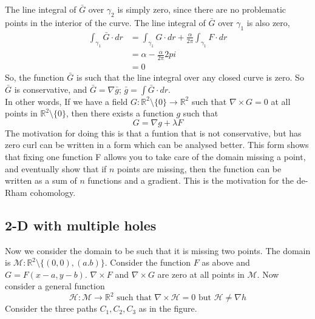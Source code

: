 \documentclass[a4paper]{article}
\begin{document}
The line integral of $\bar{G}$ over $\gamma_2$ is simply zero, since there are no problematic points in the interior of the curve. The line integral of $\bar{G}$ over $\gamma_1$ is also zero, 
\begin{align*}
    \int_{\gamma_1} \bar{G} \cdot dr &= \int_{\gamma_1} G \cdot dr + \frac{\alpha}{2\pi} \int_{\gamma_1} F \cdot dr \\
    &= \alpha - \frac{\alpha}{2\pi} 2pi\\
    &= 0
\end{align*}
So, the function $\bar{G}$ is such that the line integral over any closed curve is zero. So $\bar{G}$ is conservative, and $\bar{G} = \nabla \bar{g}$; $\bar{g} = \int \bar{G} \cdot dr$.  \\
In other words, If we have a field \(G: \mathbb{R}^2 \setminus \{0\} \rightarrow \mathbb{R}^2\) such that \(\nabla \times G = 0\) at all points in $\mathbb{R}^2 \setminus \{0\}$, then there exists a function $g$ such that
\[
    G = \nabla g + \lambda F\]
The motivation for doing this is that a funtion that is not conservative, but has zero curl can be written in a form which can be analysed better. This form shows that fixing one function F allows you to take care of the domain missing a point, and eventually show that if $n$ points are missing, then the function can be written as a sum of $n$ functions and a gradient. This is the motivation for the de-Rham cohomology.
\subsection{2-D with multiple holes}
Now we consider the domain to be such that it is missing two points. The domain is $\mathcal{M} : \mathbb{R}^2 \setminus \{(0, 0), (a.b)\}$. Consider the function $F$ as above and $G = F(x-a, y-b)$. $\nabla \times F$ and $\nabla \times G$ are zero at all points in $\mathcal{M}$. Now consider a general function $$\mathcal{H}: \mathcal{M} \rightarrow \mathbb{R}^2 \text{ such that }\nabla \times \mathcal{H} = 0 \text{ but } \mathcal{H} \neq \nabla h$$
Consider the three paths $C_1, C_2, C_3$ as in the figure.
\end{document}
